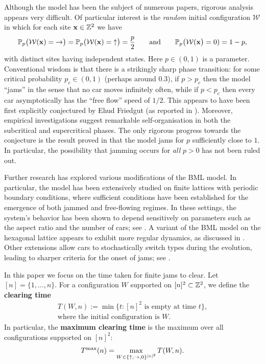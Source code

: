 \documentclass[reqno]{amsart}
\begin{document}
 Although the model has been the subject of numerous papers, rigorous analysis appears very difficult.  Of particular interest is the \emph{random} initial configuration $\mathcal{W}$ in which for each site $\mathbf{x}\in \mathbb{Z}^2$ we have
\begin{equation*}
\mathbb{P}_p\bigl(\mathcal{W}(\mathbf{x}) = \mathord{\rightarrow}\bigr) = \mathbb{P}_p\bigl(\mathcal{W}(\mathbf{x}) = \mathord{\uparrow}\bigr) = \frac{p}{2} \qquad \text{and} \qquad \mathbb{P}_p\bigl(\mathcal{W}(\mathbf{x}\bigr) =0) = 1-p,
\end{equation*}
with distinct sites having independent states.  Here $p\in(0,1)$ is a parameter.
Conventional wisdom is that there is a strikingly sharp phase transition: for some critical probability $p_c\in(0,1)$ (perhaps around $0.3$), if $p>p_c$ then the model ``jams'' in the sense that no car moves infinitely often, while if $p<p_c$ then every car asymptotically has the ``free flow'' speed of $1/2$.  This appears to have been first explicitly conjectured by Ehud Friedgut (as reported in \cite{2005_Holroyd}).  Moreover, empirical investigations suggest remarkable self-organisation in both the subcritical and supercritical phases.  The only rigorous progress towards the conjecture is the result proved in \cite{2005_Holroyd} that the model jams for $p$ sufficiently close to $1$.  In particular, the possibility that jamming occurs for \emph{all} $p>0$ has not been ruled out.

Further research has explored various modifications of the BML model. In particular, the model has been extensively studied on finite lattices with periodic boundary conditions, where sufficient conditions have been established for the emergence of both jammed and free-flowing regimes. In these settings, the system's behavior has been shown to depend sensitively on parameters such as the aspect ratio and the number of cars; see \cite{austin2006numbercarsselforganization, dsouza2004geometricstructurecoexistingphases, mordadi2019}. A variant of the BML model on the hexagonal lattice appears to exhibit more regular dynamics, as discussed in \cite{Olmos_2017}. Other extensions allow cars to stochastically switch types during the evolution, leading to sharper criteria for the onset of jams; see \cite{yashina2023necessaryconditionselforganizationbml, kozlov2023sufficientloadingconditionsselforganization}.

In this paper we focus on the time taken for finite jams to clear.  Let $[n]=\{1,\ldots,n\}$.  For a configuration $W$ supported on $[n]^2\subset\mathbb{Z}^2$, we define the \textbf{clearing time}
\begin{gather*}
    T(W,n) := \min \bigl\{ t: [n]^2 \text{ is empty at time $t$}\bigr\},\\ \text{where the initial configuration is $W$}.
\end{gather*}
In particular, the \textbf{maximum clearing time} is the maximum over all configurations supported on $[n]^2$:
$$T^{\text{\rm max}}(n) = \max_{W \in \{\mathord{\uparrow},\mathord{\rightarrow}, 0 \}^{[n]^2}} T(W,n).$$
\end{document}
